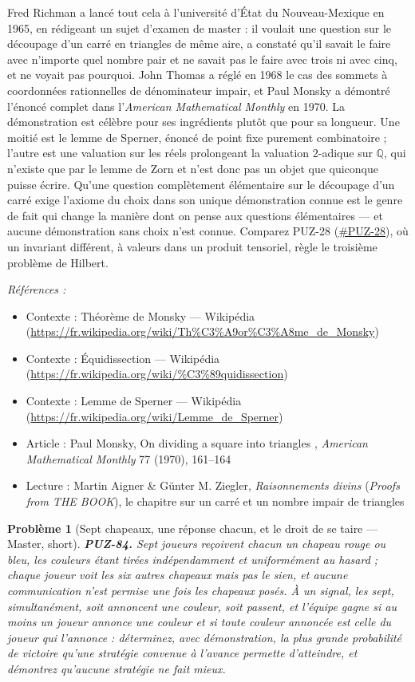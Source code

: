 \documentclass[11pt]{article}
\newtheorem{problem}{Problème}
\newenvironment{refs}{\par\small\noindent\emph{Références :}\begin{itemize}\setlength\itemsep{0pt}}{\end{itemize}\normalsize}
\begin{document}
\noindent Fred Richman a lancé tout cela à l'université d'État du Nouveau-Mexique en
1965, en rédigeant un sujet d'examen de master : il voulait une question sur le découpage
d'un carré en triangles de même aire, a constaté qu'il savait le faire avec n'importe quel
nombre pair et ne savait pas le faire avec trois ni avec cinq, et ne voyait pas pourquoi.
John Thomas a réglé en 1968 le cas des sommets à coordonnées rationnelles de dénominateur
impair, et Paul Monsky a démontré l'énoncé complet dans l'\textit{American Mathematical
Monthly} en 1970. La démonstration est célèbre pour ses ingrédients plutôt que pour sa
longueur. Une moitié est le lemme de Sperner, énoncé de point fixe purement combinatoire ;
l'autre est une valuation sur les réels prolongeant la valuation $ 2 $-adique sur
$ \mathbb{Q} $, qui n'existe que par le lemme de Zorn et n'est donc pas un objet que
quiconque puisse écrire. Qu'une question complètement élémentaire sur le découpage d'un carré
exige l'axiome du choix dans son unique démonstration connue est le genre de fait qui change
la manière dont on pense aux questions élémentaires --- et aucune démonstration sans choix
n'est connue. Comparez PUZ-28 (\url{#PUZ-28}), où un invariant différent, à valeurs dans
un produit tensoriel, règle le troisième problème de Hilbert.

\begin{refs}
\item Contexte : Théorème de Monsky --- Wikipédia (\url{https://fr.wikipedia.org/wiki/Th%C3%A9or%C3%A8me_de_Monsky})
\item Contexte : Équidissection --- Wikipédia (\url{https://fr.wikipedia.org/wiki/%C3%89quidissection})
\item Contexte : Lemme de Sperner --- Wikipédia (\url{https://fr.wikipedia.org/wiki/Lemme_de_Sperner})
\item Article : Paul Monsky, \og{} On dividing a square into triangles \fg{}, \textit{American Mathematical Monthly} 77 (1970), 161--164
\item Lecture : Martin Aigner \& Günter M. Ziegler, \textit{Raisonnements divins} (\textit{Proofs from THE BOOK}), le chapitre sur un carré et un nombre impair de triangles
\end{refs}

\bigskip

\begin{problem}[{Sept chapeaux, une réponse chacun, et le droit de se taire --- Master, short}]
\textbf{PUZ-84.} Sept joueurs reçoivent chacun un chapeau rouge ou bleu,
les couleurs étant tirées indépendamment et uniformément au hasard ; chaque joueur voit les
six autres chapeaux mais pas le sien, et aucune communication n'est permise une fois les
chapeaux posés. À un signal, les sept, simultanément, soit annoncent une couleur, soit
passent, et l'équipe gagne si au moins un joueur annonce une couleur et si toute couleur
annoncée est celle du joueur qui l'annonce : déterminez, avec démonstration, la plus grande
probabilité de victoire qu'une stratégie convenue à l'avance permette d'atteindre, et
démontrez qu'aucune stratégie ne fait mieux.
\end{problem}
\end{document}
